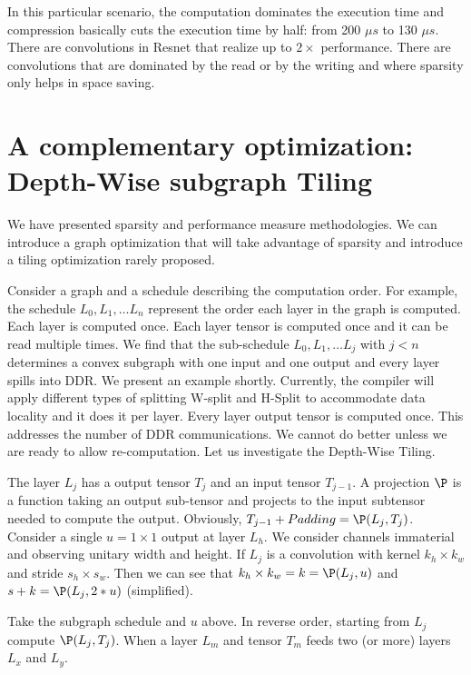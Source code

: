 \documentclass[conference]{IEEEtran}
\begin{document}
In this particular scenario, the computation dominates the execution
time and compression basically cuts the execution time by half: from
200 $\mu s$ to 130 $\mu s$. There are convolutions in Resnet that
realize up to $2\times$ performance. There are convolutions that are
dominated by the read or by the writing and where sparsity only helps
in space saving.



\section{A complementary optimization: Depth-Wise subgraph Tiling}
We have presented sparsity and performance measure methodologies. We
can introduce a graph optimization that will take advantage of
sparsity and introduce a tiling optimization rarely proposed.

Consider a graph and a schedule describing the computation order. For
example, the schedule $L_0, L_1, \dots L_n$ represent the order each
layer in the graph is computed. Each layer is computed once. Each
layer tensor is computed once and it can be read multiple times. We
find that the sub-schedule $L_0, L_1, \dots L_j$ with $j<n$ determines
a convex subgraph with one input and one output and every layer spills
into DDR. We present an example shortly. Currently, the compiler will
apply different types of splitting W-split and H-Split to accommodate
data locality and it does it per layer. Every layer output tensor is
computed once. This addresses the number of DDR communications. We
cannot do better unless we are ready to allow re-computation. Let us
investigate the Depth-Wise Tiling.

The layer $L_j$ has a output tensor $T_j$ and an input tensor
$T_{j-1}$. A projection $\P$ is a function taking an output sub-tensor
and projects to the input subtensor needed to compute the
output. Obviously, $T_{j-1} + Padding = \P(L_j,T_j)$. Consider a
single $u = 1\times 1$ output at layer $L_h$. We consider channels
immaterial and observing unitary width and height. If $L_j$ is a
convolution with kernel $k_h\times k_w$ and stride $s_h \times
s_w$. Then we can see that $k_h\times k_w = k = \P(L_j,u)$ and $s+k =
\P(L_j,2*u)$ (simplified).

Take the subgraph schedule and $u$ above. In reverse order, starting
from $L_j$ compute $\P(L_j,T_j)$. When a layer $L_m$ and tensor $T_m$
feeds two (or more) layers $L_x$ and $L_y$. 
\end{document}
